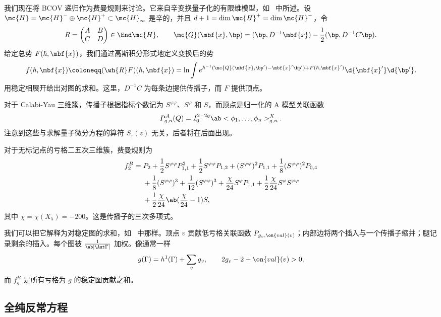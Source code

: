 我们现在将 BCOV 递归作为费曼规则来讨论。它来自辛变换量子化的有限维模型，如~ 中所述。设 \(\mc{H} = \mc{H}^- \oplus \mc{H}^+ \subset \mc{H}_{\infty}\) 是辛的，并且 \(d+1 = \dim \mc{H}^+ = \dim \mc{H}^-\)，令
\[ R = \begin{pmatrix} A & B \\ C & D \end{pmatrix} \in \End \mc{H}, \qquad \mc{Q}(\mbf{x},\bp) = (\bp, D^{-1}\mbf{x}) - \frac{1}{2}(\bp, D^{-1}C\bp). \]
给定总势 \(F(\hbar, \mbf{x})\)，我们通过高斯积分形式地定义变换后的势
\[ f(\hbar, \mbf{x}) \coloneqq (\wh{R}F)(\hbar,\mbf{x}) = \ln \int e^{\hbar^{-1}(\mc{Q}(\mbf{x},\bp') - \mbf{x}'\bp') + F(\hbar,\mbf{x}')}\d{\mbf{x}'}\d{\bp'}. \]
用稳定相展开给出对图的求和。这里，\(D^{-1}C\) 为每条边提供传播子，而 \(F\) 提供顶点。

对于 Calabi-Yau 三维簇，传播子根据指标个数记为 \(S^{\varphi\varphi}\)、\(S^{\varphi}\) 和 \(S\)，而顶点是归一化的 A 模型关联函数
\[ P^A_{g,n}(Q) = I_0^{2-2g}\ab<\phi_1, \ldots, \phi_n>^X_{g,n}. \]
注意到这些与求解量子微分方程的算符 \(S_{\tau}(z)\) 无关，后者将在后面出现。

\begin{exm}
    对于无标记点的亏格二五次三维簇，费曼规则为
    \begin{align*}
        f_2^B ={}& P_2 + \frac{1}{2}S^{\varphi\varphi}P_{1,1}^2 + \frac{1}{2}S^{\varphi\varphi}P_{1,2} + (S^{\varphi\varphi})^2 P_{1,1} + \frac{1}{8}(S^{\varphi\varphi})^2 P_{0,4} \\
        &+ \frac{1}{8}(S^{\varphi\varphi})^3 + \frac{1}{12}(S^{\varphi\varphi})^3 + \frac{\chi}{24}S^{\varphi}P_{1,1} + \frac{1}{2}\frac{\chi}{24}S^{\varphi}S^{\varphi\varphi} \\
        &+ \frac{1}{2}\frac{\chi}{24}\ab(\frac{\chi}{24}-1)S,
    \end{align*}
    其中 \(\chi = \chi(X_5) = -200\)。这是传播子的三次多项式。
\end{exm}

我们可以把它解释为对稳定图的求和，如~ 中那样。顶点 \(v\) 贡献低亏格关联函数 \(P_{g_v, \on{val}(v)}\)；内部边将两个插入与一个传播子缩并；腿记录剩余的插入。每个图被 \(\frac{1}{\ab|\Aut \Gamma|}\) 加权。像通常一样
\[ g(\Gamma) = h^1(\Gamma) + \sum_v g_v, \qquad 2g_v - 2 + \on{val}(v) > 0, \]
而 \(f_g^B\) 是所有亏格为 \(g\) 的稳定图贡献之和。

\subsection{全纯反常方程}%
\label{sub:The holomorphic anomaly equation}

